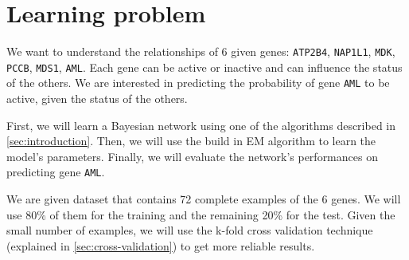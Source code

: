 \section{Learning problem}
\label{sec:learning-problem}

We want to understand the relationships of 6 given genes: \texttt{ATP2B4}, \texttt{NAP1L1}, \texttt{MDK}, \texttt{PCCB}, \texttt{MDS1}, \texttt{AML}.
Each gene can be active or inactive and can influence the status of the others.
We are interested in predicting the probability of gene \texttt{AML} to be active, given the status of the others.

First, we will learn a Bayesian network using one of the algorithms described in \cref{sec:introduction}.
Then, we will use the build in \ac{EM} algorithm to learn the model's parameters.
Finally, we will evaluate the network's performances on predicting gene \texttt{AML}.

We are given dataset that contains \num{72} complete examples of the \num{6} genes.
We will use \num{80}\% of them for the training and the remaining \num{20}\% for the test.
Given the small number of examples, we will use the k-fold cross validation technique (explained in \cref{sec:cross-validation}) to get more reliable results.
